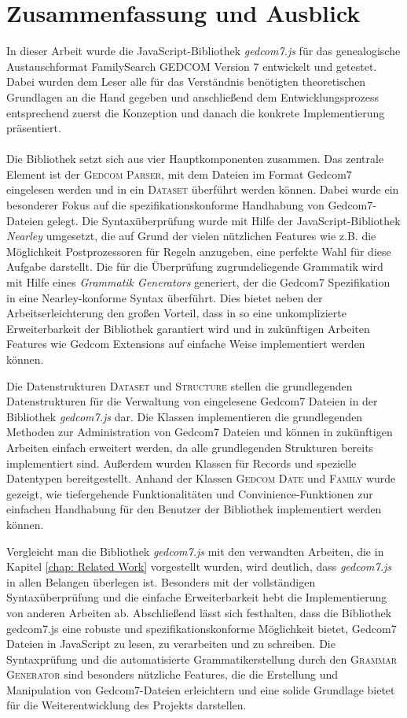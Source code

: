 \chapter{Zusammenfassung und Ausblick}
\label{chap: Zusammenfassung und Ausblick}
In dieser Arbeit wurde die JavaScript-Bibliothek \textit{gedcom7.js} für das genealogische Austauschformat FamilySearch GEDCOM Version 7 entwickelt und getestet. Dabei wurden dem Leser alle für das Verständnis benötigten theoretischen Grundlagen an die Hand gegeben und anschließend dem Entwicklungsprozess entsprechend zuerst die Konzeption und danach die konkrete Implementierung präsentiert. 
\\ \\
Die Bibliothek setzt sich aus vier Hauptkomponenten zusammen. Das zentrale Element ist der \textsc{Gedcom Parser}, mit dem Dateien im Format Gedcom7 eingelesen werden und in ein \textsc{Dataset} überführt werden können.
Dabei wurde ein besonderer Fokus auf die spezifikationskonforme Handhabung von Gedcom7-Dateien gelegt. Die Syntaxüberprüfung wurde mit Hilfe der JavaScript-Bibliothek \textit{Nearley} umgesetzt, die auf Grund der vielen nützlichen Features wie z.B. die Möglichkeit Postprozessoren für Regeln anzugeben, eine perfekte Wahl für diese Aufgabe darstellt. Die für die Überprüfung zugrundeliegende Grammatik wird mit Hilfe eines \textit{Grammatik Generators} generiert, der die Gedcom7 Spezifikation in eine Nearley-konforme Syntax überführt. Dies bietet neben der Arbeitserleichterung den großen Vorteil, dass in so eine unkomplizierte Erweiterbarkeit der Bibliothek garantiert wird und in zukünftigen Arbeiten Features wie Gedcom Extensions auf einfache Weise implementiert werden können. 


Die Datenstrukturen \textsc{Dataset} und \textsc{Structure} stellen die grundlegenden Datenstrukturen für die Verwaltung von eingelesene Gedcom7 Dateien in der Bibliothek \textit{gedcom7.js} dar. Die Klassen implementieren die grundlegenden Methoden zur Administration von Gedcom7 Dateien und können in zukünftigen Arbeiten einfach erweitert werden, da alle grundlegenden Strukturen bereits implementiert sind. Außerdem wurden Klassen für Records und spezielle Datentypen bereitgestellt. Anhand der Klassen \textsc{Gedcom Date} und \textsc{Family} wurde gezeigt, wie tiefergehende Funktionalitäten und Convinience-Funktionen zur einfachen Handhabung für den Benutzer der Bibliothek implementiert werden können. 


Vergleicht man die Bibliothek \textit{gedcom7.js} mit den verwandten Arbeiten, die in Kapitel \ref{chap: Related Work} vorgestellt wurden, wird deutlich, dass \textit{gedcom7.js} in allen Belangen überlegen ist. Besonders mit der vollständigen Syntaxüberprüfung und die einfache Erweiterbarkeit hebt die Implementierung von anderen Arbeiten ab. 
\newpage
{
\noindent
Abschließend lässt sich festhalten, dass die Bibliothek gedcom7.js eine robuste und spezifikationskonforme Möglichkeit bietet, Gedcom7 Dateien in JavaScript zu lesen, zu verarbeiten und zu schreiben. Die Syntaxprüfung und die automatisierte Grammatikerstellung durch den \textsc{Grammar Generator} sind besonders nützliche Features, die die Erstellung und Manipulation von Gedcom7-Dateien erleichtern und eine solide Grundlage bietet für die Weiterentwicklung des Projekts darstellen.
}